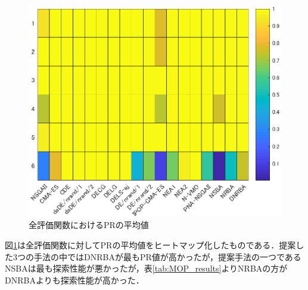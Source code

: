 \documentclass[twocolumn, a4paper]{UECIEresume}
\begin{document}
\begin{figure}[b]
\centering
\includegraphics[width=0.8\linewidth]{eps/E-1.eps}
\caption{全評価関数におけるPRの平均値}
\label{fig:resutls_comp_E1}
\end{figure}




図\ref{fig:resutls_comp_E1}は全評価関数に対してPRの平均値をヒートマップ化したものである．提案した3つの手法の中ではDNRBAが最もPR値が高かったが，提案手法の一つであるNSBAは最も探索性能が悪かったが，表\ref{tab:MOP_results}よりNRBAの方がDNRBAよりも探索性能が高かった．
\end{document}
